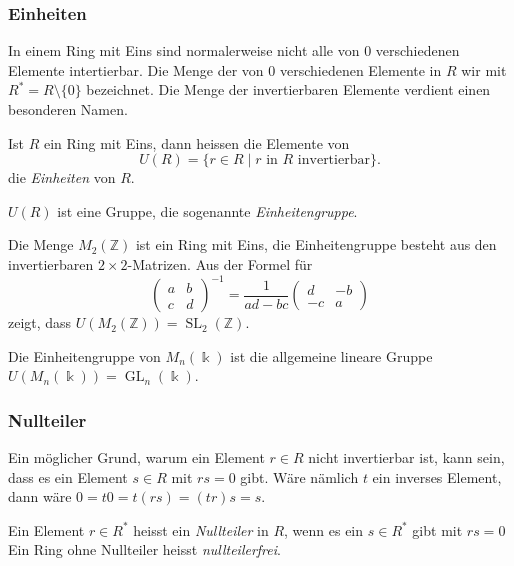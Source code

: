 \subsubsection{Einheiten}
In einem Ring mit Eins sind normalerweise nicht alle von $0$ verschiedenen
Elemente intertierbar.
Die Menge der von $0$ verschiedenen Elemente in $R$ wir mit $R^*=R\setminus\{0\}$
bezeichnet.
%
Die Menge der invertierbaren Elemente verdient einen besonderen Namen.

\begin{definition}
Ist $R$ ein Ring mit Eins, dann heissen die Elemente von
\[
U(R) = \{ r\in R \;|\; \text{$r$ in $R$ invertierbar}\}.
\]
die {\em Einheiten} von $R$.
%
\end{definition}

\begin{satz}
$U(R)$ ist eine Gruppe, die sogenannte {\em Einheitengruppe}.
%
\end{satz}

\begin{beispiel}
Die Menge $M_2(\mathbb{Z})$ ist ein Ring mit Eins, die Einheitengruppe
besteht aus den invertierbaren $2\times 2$-Matrizen. 
Aus der Formel für 
\[
\begin{pmatrix}
a&b\\
c&d
\end{pmatrix}^{-1}
=
\frac{1}{ad-bc}\begin{pmatrix}
d&-b\\
-c&a
\end{pmatrix}
\]
zeigt, dass $U(M_2(\mathbb{Z})) = \operatorname{SL}_2(\mathbb{Z})$.
\end{beispiel}

\begin{beispiel}
Die Einheitengruppe von $M_n(\Bbbk)$ ist die allgemeine lineare Gruppe 
$U(M_n(\Bbbk))=\operatorname{GL}_n(\Bbbk)$.
\end{beispiel}

\subsubsection{Nullteiler}
Ein möglicher Grund, warum ein Element $r\in R$ nicht invertierbar
ist, kann sein, dass es ein Element $s\in R$ mit $rs=0$ gibt.
Wäre nämlich $t$ ein inverses Element, dann wäre $0=t0 = t(rs) = (tr)s=s$.

\begin{definition}
\label{buch:grundlagen:def:nullteiler}
Ein Element $r\in R^*$ heisst ein {\em Nullteiler} in $R$,
wenn es ein $s\in R^*$ gibt mit $rs=0$
Ein Ring ohne Nullteiler heisst {\em nullteilerfrei}.
\end{definition}
%
%

